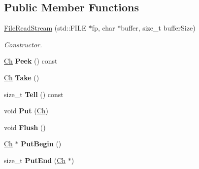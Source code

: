 \subsection*{Public Member Functions}
\begin{DoxyCompactItemize}
\item 
\hyperlink{classFileReadStream_adf91191843d50b900f43cb4f35f16f67}{File\+Read\+Stream} (std\+::\+F\+I\+LE $\ast$fp, char $\ast$buffer, size\+\_\+t buffer\+Size)
\begin{DoxyCompactList}\small\item\em Constructor. \end{DoxyCompactList}\item 
\mbox{\label{classFileReadStream_ab7d47da8952d3fe5856a261ec3c020c9}} 
\hyperlink{classFileReadStream_ae1f83d9ca3c76d1d151af0b6c427f046}{Ch} {\bfseries Peek} () const
\item 
\mbox{\label{classFileReadStream_addcbccc9d86ccbbe6d8e876ba595dbcb}} 
\hyperlink{classFileReadStream_ae1f83d9ca3c76d1d151af0b6c427f046}{Ch} {\bfseries Take} ()
\item 
\mbox{\label{classFileReadStream_ae82cfaafe347286b3af8976548bedf86}} 
size\+\_\+t {\bfseries Tell} () const
\item 
\mbox{\label{classFileReadStream_a4f2eac5b08033b1527bff517be657a36}} 
void {\bfseries Put} (\hyperlink{classFileReadStream_ae1f83d9ca3c76d1d151af0b6c427f046}{Ch})
\item 
\mbox{\label{classFileReadStream_acd031e3f578b23bc2a792ac41e1e95ae}} 
void {\bfseries Flush} ()
\item 
\mbox{\label{classFileReadStream_ac985850ab75f204dc08a01d12a8ef5c6}} 
\hyperlink{classFileReadStream_ae1f83d9ca3c76d1d151af0b6c427f046}{Ch} $\ast$ {\bfseries Put\+Begin} ()
\item 
\mbox{\label{classFileReadStream_a886660c89f698ff913d641d61466108f}} 
size\+\_\+t {\bfseries Put\+End} (\hyperlink{classFileReadStream_ae1f83d9ca3c76d1d151af0b6c427f046}{Ch} $\ast$)
\item 
\mbox{\label{classFileReadStream_a03f0b804c4c96762d0c6ef536337b7f0}} 

\end{DoxyCompactItemize}
